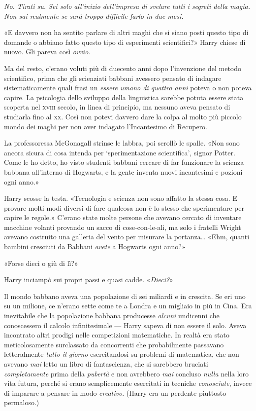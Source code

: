 \textit{No. Tirati su. Sei solo all’inizio dell’impresa di svelare tutti i segreti della magia. Non sai realmente se sarà troppo difficile farlo in due mesi.}

«E davvero non ha sentito parlare di altri maghi che si siano posti questo tipo di domande o abbiano fatto questo tipo di esperimenti scientifici?» Harry chiese di nuovo. Gli pareva così \textit{ovvio}.

Ma del resto, c’erano voluti più di duecento anni dopo l’invenzione del metodo scientifico, prima che gli scienziati babbani avessero pensato di indagare sistematicamente quali frasi un \textit{essere umano di quattro anni} poteva o non poteva capire. La psicologia dello sviluppo della linguistica sarebbe potuta essere stata scoperta nel \textsc{xviii} secolo, in linea di principio, ma nessuno aveva pensato di studiarla fino al \textsc{xx}. Così non potevi davvero dare la colpa al molto più piccolo mondo dei maghi per non aver indagato l’Incantesimo di Recupero.

La professoressa McGonagall strinse le labbra, poi scrollò le spalle. «Non sono ancora sicura di cosa intenda per ‘sperimentazione scientifica’, signor Potter. Come le ho detto, ho visto studenti babbani cercare di far funzionare la scienza babbana all’interno di Hogwarts, e la gente inventa nuovi incantesimi e pozioni ogni anno.»

Harry scosse la testa. «Tecnologia e scienza non sono affatto la stessa cosa. E provare molti modi diversi di fare qualcosa non è lo stesso che sperimentare per capire le regole.» C’erano state molte persone che avevano cercato di inventare macchine volanti provando un sacco di cose-con-le-ali, ma solo i fratelli Wright avevano costruito una galleria del vento per misurare la portanza… «Ehm, quanti bambini cresciuti da Babbani \textit{avete} a Hogwarts ogni anno?»

«Forse dieci o giù di lì?»

Harry inciampò sui propri passi e quasi cadde. «\textit{Dieci?}»

Il mondo babbano aveva una popolazione di sei miliardi e in crescita. Se eri uno su un milione, ce n’erano sette come te a Londra e un migliaio in più in Cina. Era inevitabile che la popolazione babbana producesse \textit{alcuni} undicenni che conoscessero il calcolo infinitesimale — Harry sapeva di non essere il solo. Aveva incontrato altri prodigi nelle competizioni matematiche. In realtà era stato meticolosamente surclassato da concorrenti che probabilmente passavano letteralmente \textit{tutto il giorno} esercitandosi su problemi di matematica, che non avevano \textit{mai} letto un libro di fantascienza, che si sarebbero bruciati \textit{completamente} prima della \textit{pubertà} e non avrebbero \textit{mai} concluso \textit{nulla} nella loro vita futura, perché si erano semplicemente esercitati in tecniche \textit{conosciute}, invece di imparare a pensare in modo \textit{creativo}. (Harry era un perdente piuttosto permaloso.)

